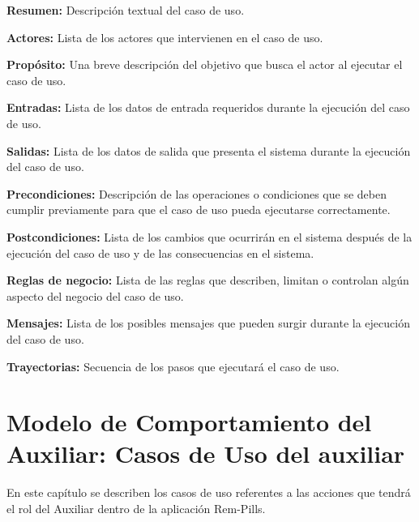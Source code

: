 \begin{objetivos}
	\item {\bf Resumen:} Descripción textual del caso de uso.
	\item {\bf Actores:} Lista de los actores que intervienen en el caso de uso.
	\item {\bf Propósito:} Una breve descripción del objetivo que busca el actor al ejecutar el caso de uso.
	\item {\bf Entradas:} Lista de los datos de entrada requeridos durante la ejecución del caso de uso.
	\item {\bf Salidas:} Lista de los datos de salida que presenta el sistema durante la ejecución del caso de uso.
	\item {\bf Precondiciones:} Descripción de las operaciones o condiciones que se deben cumplir previamente para que el caso de uso pueda ejecutarse correctamente.
	\item {\bf Postcondiciones:} Lista de los cambios que ocurrirán en el sistema después de la ejecución del caso de uso y de las consecuencias en el sistema.
	\item {\bf Reglas de negocio:} Lista de las reglas que describen, limitan o controlan algún aspecto del negocio del caso de uso.
	\item {\bf Mensajes:} Lista de los posibles mensajes que pueden surgir durante la ejecución del caso de uso.
	\item {\bf Trayectorias:} Secuencia de los pasos que ejecutará el caso de uso.
\end{objetivos}
%

%
%
\chapter{Modelo de Comportamiento del Auxiliar: Casos de Uso del auxiliar \label{chp:modeloComportamientoAuxiliar}}
\newpage
En este capítulo se describen los casos de uso referentes a las acciones que tendrá el rol del Auxiliar dentro de la aplicación Rem-Pills. \bigskip

